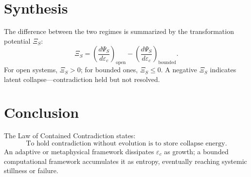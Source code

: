 \documentclass[12pt]{article}
\begin{document}
\section*{Synthesis}
The difference between the two regimes is summarized by the transformation potential $\Xi_S$:
\[
\Xi_S = 
\left(
\frac{d\Psi_S}{d\varepsilon_c}
\right)_{\text{open}}
-
\left(
\frac{d\Psi_S}{d\varepsilon_c}
\right)_{\text{bounded}}.
\]
For open systems, $\Xi_S > 0$; for bounded ones, $\Xi_S \le 0$.
A negative $\Xi_S$ indicates latent collapse—contradiction held but not resolved.

\section*{Conclusion}
The Law of Contained Contradiction states:
\[
\boxed{
\text{To hold contradiction without evolution is to store collapse energy.}
}
\]
An adaptive or metaphysical framework dissipates $\varepsilon_c$ as growth;
a bounded computational framework accumulates it as entropy,
eventually reaching systemic stillness or failure.
\end{document}

